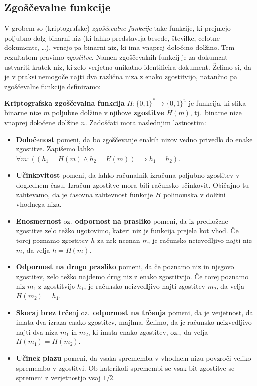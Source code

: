 \documentclass[isrm2, tisk]{fmfdelo}
\begin{document}
\subsection{Zgoščevalne funkcije}
V grobem so (kriptografske) \textit{zgoščevalne funkcije} take funkcije, ki prejmejo poljubno dolg binarni 
niz (ki lahko predstavlja besede, številke, celotne dokumente, \dots), vrnejo pa binarni niz, ki ima
vnaprej določeno dolžino. Tem rezultatom pravimo \textit{zgostitve}. Namen zgoščevalnih funkcij je 
za dokument ustvariti kratek niz, ki zelo verjetno unikatno identificira dokument. Želimo si, da
je v praksi nemogoče najti dva različna niza z enako zgostitvijo, natančno pa zgoščevalne funkcije
definiramo:

\begin{definicija} 
\label{def:hash}
    \textbf{Kriptografska zgoščevalna funkcija} $H: \{0, 1\}^* \rightarrow \{0, 1\}^n$ je funkcija, 
    ki slika binarne nize $m$ poljubne dolžine v njihove \textbf{zgostitve} $H(m)$, tj.\ binarne nize 
    vnaprej določene dolžine $n$. Zadoščati mora naslednjim lastnostim:
    \begin{itemize}
        \item \textbf{Določenost} pomeni, da bo zgoščevanje enakih nizov vedno privedlo do enake 
            zgostitve. Zapišemo lahko $\forall m: ((h_1 = H(m) \wedge h_2 = H(m)) \implies h_1 = h_2)$.
        \item \textbf{Učinkovitost} pomeni, da lahko računalnik izračuna poljubno zgostitev v doglednem 
            času. Izračun zgostitve mora biti računsko učinkovit. Običajno tu zahtevamo, da je časovna
            zahtevnost funkcije $H$ polinomska v dolžini vhodnega niza.
        \item \textbf{Enosmernost} oz.\ \textbf{odpornost na prasliko} pomeni, da iz predložene 
            zgostitve zelo težko ugotovimo, kateri niz je funkcija prejela kot vhod. Če torej poznamo 
            zgostitev $h$ za nek neznan $m$, je računsko neizvedljivo najti niz $m$, da velja $h = H(m)$.
        \item \textbf{Odpornost na drugo prasliko} pomeni, da če poznamo niz in njegovo zgostitev, 
            zelo težko najdemo drug niz z enako zgostitvijo. Če torej poznamo niz $m_1$ z zgostitvijo
            $h_1$, je računsko neizvedljivo najti zgostitev $m_2$, da velja $H(m_2) = h_1$.
        \item \textbf{Skoraj brez trčenj} oz.\ \textbf{odpornost na trčenja} pomeni, da je verjetnost,
            da imata dva izraza enako zgostitev, majhna. Želimo, da je računsko neizvedljivo
            najti dva niza  $m_1$ in $m_2$, ki imata enako zgostitev, oz.,\ da velja $H(m_1) = H(m_2)$.
        \item \textbf{Učinek plazu} pomeni, da vsaka sprememba v vhodnem nizu povzroči veliko spremembo 
            v zgostitvi. Ob katerikoli spremembi se vsak bit zgostitve se spremeni z verjetnostjo 
            vsaj $1/2$.
    \end{itemize}
\end{definicija}
\end{document}
